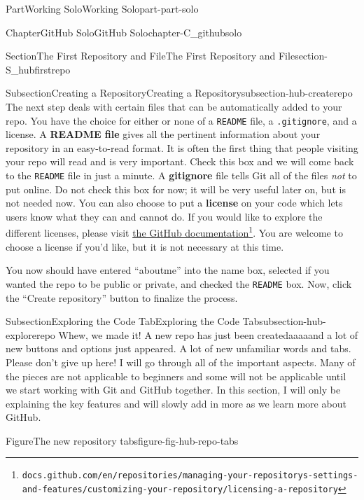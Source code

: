 \documentclass[oneside,10pt,]{book}
\newcommand{\mono}[1]{\texttt{#1}}
\newcommand{\terminology}[1]{\textbf{#1}}
\begin{document}
\begin{partptx}{Part}{Working Solo}{}{Working Solo}{}{}{part-part-solo}
\begin{chapterptx}{Chapter}{GitHub Solo}{}{GitHub Solo}{}{}{chapter-C_githubsolo}
\begin{sectionptx}{Section}{The First Repository and File}{}{The First Repository and File}{}{}{section-S_hubfirstrepo}
\begin{subsectionptx}{Subsection}{Creating a Repository}{}{Creating a Repository}{}{}{subsection-hub-createrepo}
 The next step deals with certain files that can be automatically added to your repo. You have the choice for either or none of a \mono{README} file, a \mono{.gitignore}, and a license. A \terminology{README file} gives all the pertinent information about your repository in an easy-to-read format. It is often the first thing that people visiting your repo will read and is very important. Check this box and we will come back to the \mono{README} file in just a minute. A \terminology{gitignore} file tells Git all of the files \emph{not} to put online. Do not check this box for now; it will be very useful later on, but is not needed now. You can also choose to put a \terminology{license} on your code which lets users know what they can and cannot do. If you would like to explore the different licenses, please visit \href{https://docs.github.com/en/repositories/managing-your-repositorys-settings-and-features/customizing-your-repository/licensing-a-repository}{the GitHub documentation}\footnote{\nolinkurl{docs.github.com/en/repositories/managing-your-repositorys-settings-and-features/customizing-your-repository/licensing-a-repository}\label{fn-hub-createrepo-k-l}}. You are welcome to choose a license if you'd like, but it is not necessary at this time.%
\par
You now should have entered ``aboutme'' into the name box, selected if you wanted the repo to be public or private, and checked the \mono{README} box. Now, click the ``Create repository'' button to finalize the process.%
\end{subsectionptx}
%
%
\typeout{************************************************}
\typeout{************************************************}
%
\begin{subsectionptx}{Subsection}{Exploring the Code Tab}{}{Exploring the Code Tab}{}{}{subsection-hub-explorerepo}
%
Whew, we made it! A new repo has just been created\textellipsis{}aaaaand a lot of new buttons and options just appeared. A lot of new unfamiliar words and tabs. Please don't give up here! I will go through all of the important aspects. Many of the pieces are not applicable to beginners and some will not be applicable until we start working with Git and GitHub together. In this section, I will only be explaining the key features and will slowly add in more as we learn more about GitHub.%
\begin{figureptx}{Figure}{The new repository tabs}{figure-fig-hub-repo-tabs}{}%

\end{figureptx}
\end{subsectionptx}
\end{sectionptx}
\end{chapterptx}
\end{partptx}
\end{document}
